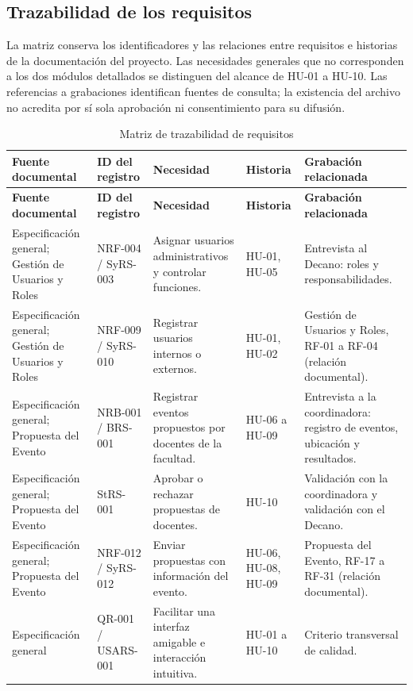 \subsection{Trazabilidad de los requisitos}
La matriz conserva los identificadores y las relaciones entre requisitos e historias de la documentación del proyecto. Las necesidades generales que no corresponden a los dos módulos detallados se distinguen del alcance de HU-01 a HU-10. Las referencias a grabaciones identifican fuentes de consulta; la existencia del archivo no acredita por sí sola aprobación ni consentimiento para su difusión.

{\small
\begin{longtable}{P{0.18\textwidth} P{0.18\textwidth} P{0.22\textwidth} P{0.12\textwidth} P{0.22\textwidth}}
\caption{Matriz de trazabilidad de requisitos}\\
\toprule
\textbf{Fuente documental} & \textbf{ID del registro} & \textbf{Necesidad} & \textbf{Historia} & \textbf{Grabación relacionada}\\
\midrule
\endfirsthead
\toprule
\textbf{Fuente documental} & \textbf{ID del registro} & \textbf{Necesidad} & \textbf{Historia} & \textbf{Grabación relacionada}\\
\midrule
\endhead
Especificación general; Gestión de Usuarios y Roles & NRF-004 / SyRS-003 & Asignar usuarios administrativos y controlar funciones. & HU-01, HU-05 & Entrevista al Decano: roles y responsabilidades.\\
Especificación general; Gestión de Usuarios y Roles & NRF-009 / SyRS-010 & Registrar usuarios internos o externos. & HU-01, HU-02 & Gestión de Usuarios y Roles, RF-01 a RF-04 (relación documental).\\
Especificación general; Propuesta del Evento & NRB-001 / BRS-001 & Registrar eventos propuestos por docentes de la facultad. & HU-06 a HU-09 & Entrevista a la coordinadora: registro de eventos, ubicación y resultados.\\
Especificación general; Propuesta del Evento & StRS-001 & Aprobar o rechazar propuestas de docentes. & HU-10 & Validación con la coordinadora y validación con el Decano.\\
Especificación general; Propuesta del Evento & NRF-012 / SyRS-012 & Enviar propuestas con información del evento. & HU-06, HU-08, HU-09 & Propuesta del Evento, RF-17 a RF-31 (relación documental).\\
Especificación general & QR-001 / USARS-001 & Facilitar una interfaz amigable e interacción intuitiva. & HU-01 a HU-10 & Criterio transversal de calidad.\\

\end{longtable}}
